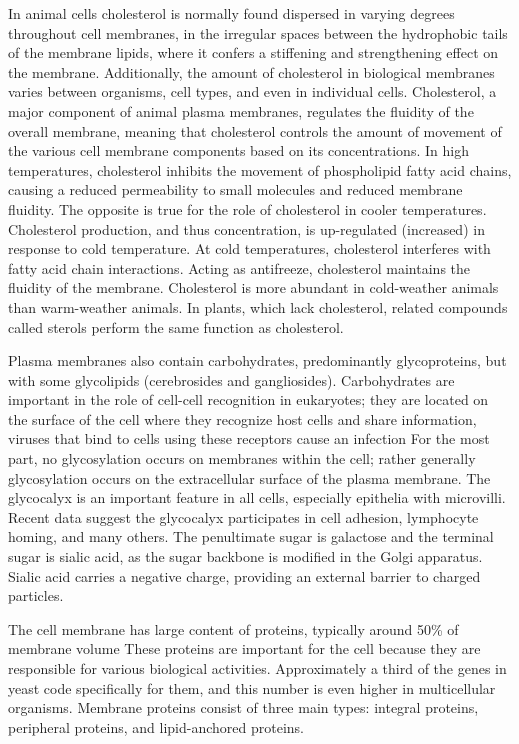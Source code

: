 \documentclass[
]{book}
\begin{document}
In animal cells cholesterol is normally found dispersed in varying degrees throughout cell membranes, in the irregular spaces between the hydrophobic tails of the membrane lipids, where it confers a stiffening and strengthening effect on the membrane. Additionally, the amount of cholesterol in biological membranes varies between organisms, cell types, and even in individual cells. Cholesterol, a major component of animal plasma membranes, regulates the fluidity of the overall membrane, meaning that cholesterol controls the amount of movement of the various cell membrane components based on its concentrations. In high temperatures, cholesterol inhibits the movement of phospholipid fatty acid chains, causing a reduced permeability to small molecules and reduced membrane fluidity. The opposite is true for the role of cholesterol in cooler temperatures. Cholesterol production, and thus concentration, is up-regulated (increased) in response to cold temperature. At cold temperatures, cholesterol interferes with fatty acid chain interactions. Acting as antifreeze, cholesterol maintains the fluidity of the membrane. Cholesterol is more abundant in cold-weather animals than warm-weather animals. In plants, which lack cholesterol, related compounds called sterols perform the same function as cholesterol.

Plasma membranes also contain carbohydrates, predominantly glycoproteins, but with some glycolipids (cerebrosides and gangliosides). Carbohydrates are important in the role of cell-cell recognition in eukaryotes; they are located on the surface of the cell where they recognize host cells and share information, viruses that bind to cells using these receptors cause an infection For the most part, no glycosylation occurs on membranes within the cell; rather generally glycosylation occurs on the extracellular surface of the plasma membrane. The glycocalyx is an important feature in all cells, especially epithelia with microvilli. Recent data suggest the glycocalyx participates in cell adhesion, lymphocyte homing, and many others. The penultimate sugar is galactose and the terminal sugar is sialic acid, as the sugar backbone is modified in the Golgi apparatus. Sialic acid carries a negative charge, providing an external barrier to charged particles.

The cell membrane has large content of proteins, typically around 50\% of membrane volume These proteins are important for the cell because they are responsible for various biological activities. Approximately a third of the genes in yeast code specifically for them, and this number is even higher in multicellular organisms. Membrane proteins consist of three main types: integral proteins, peripheral proteins, and lipid-anchored proteins.
\end{document}
